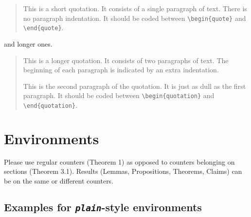 \documentclass[qe,nameyear,final,openaccess]{econsocart}
\theoremstyle{plain}
\begin{document}
\begin{quote}
This is a short quotation. It consists of a
single paragraph of text. There is no paragraph
indentation. It should be coded between \texttt{{\textbackslash}begin\{quote\}} and \texttt{{\textbackslash}end\{quote\}}.
\end{quote}

and longer ones.

\begin{quote}
This is a longer quotation. It consists of two paragraphs
of text. The beginning of each paragraph is indicated
by an extra indentation.

This is the second paragraph of the quotation. It is just
as dull as the first paragraph. It should be coded between \texttt{{\textbackslash}begin\{quotation\}} and \texttt{{\textbackslash}end\{quotation\}}.
\end{quote}

\section{Environments}

Please use regular counters (Theorem 1) as opposed to counters belonging on sections (Theorem 3.1). Results (Lemmas, Propositions, Theorems, Claims) can be on the same or different counters.

\subsection{Examples for \textit{\texttt{plain}}-style environments}
\end{document}
